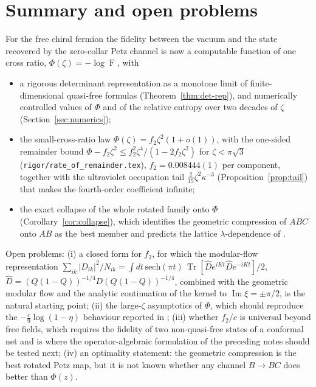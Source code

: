 \documentclass[11pt]{article}
\theoremstyle{accent}
\theoremstyle{definition}
\newcommand{\Tr}{\operatorname{Tr}}
\newcommand{\Fid}{\operatorname{F}}
\begin{document}
\section{Summary and open problems}\label{sec:summary}

For the free chiral fermion the fidelity between the vacuum and the state recovered by the zero-collar Petz channel is now a computable function of one cross ratio, \(\Phi(\zeta)=-\log\Fid\), with
\begin{itemize}
\item a rigorous determinant representation as a monotone limit of finite-dimensional quasi-free formulas (Theorem~\ref{thm:det-rep}), and numerically controlled values of \(\Phi\) and of the relative entropy over two decades of \(\zeta\) (Section~\ref{sec:numerics});
\item the small-cross-ratio law \(\Phi(\zeta)=f_2\zeta^2(1+o(1))\), with the one-sided remainder bound \(\Phi-f_2\zeta^2\le f_2^2\zeta^4/(1-2f_2\zeta^2)\) for \(\zeta<\pi\sqrt3\) (\texttt{rigor/rate\_of\_remainder.tex}), \(f_2=0.008444(1)\) per component, together with the ultraviolet occupation tail \(\frac2{15}\zeta^2\kappa^{-3}\) (Proposition~\ref{prop:tail}) that makes the fourth-order coefficient infinite;
\item the exact collapse of the whole rotated family onto \(\Phi\) (Corollary~\ref{cor:collapse}), which identifies the geometric compression of \(ABC\) onto \(AB\) as the best member and predicts the lattice \(\lambda\)-dependence of \cite{VardhanWeiZou}.
\end{itemize}
Open problems: (i) a closed form for \(f_2\), for which the modular-flow representation \(\sum_{ik}|D_{ik}|^2/N_{ik}=\int dt\,\mathrm{sech}(\pi t)\,\Tr[\widehat D e^{iKt}\widehat De^{-iKt}]/2\), \(\widehat D=(Q(1-Q))^{-1/4}D(Q(1-Q))^{-1/4}\), combined with the geometric modular flow and the analytic continuation of the kernel to \(\operatorname{Im}\xi=\pm\pi/2\), is the natural starting point; (ii) the large-\(\zeta\) asymptotics of \(\Phi\), which should reproduce the \(-\frac c9\log(1-\eta)\) behaviour reported in \cite{VardhanWeiZou}; (iii) whether \(f_2/c\) is universal beyond free fields, which requires the fidelity of two non-quasi-free states of a conformal net and is where the operator-algebraic formulation of the preceding notes should be tested next; (iv) an optimality statement: the geometric compression is the best rotated Petz map, but it is not known whether any channel \(B\to BC\) does better than \(\Phi(z)\).
\end{document}
